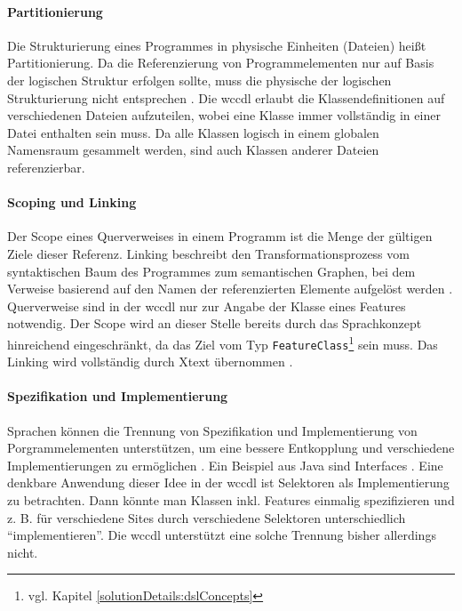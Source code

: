     \paragraph{Partitionierung}
    Die Strukturierung eines Programmes in physische Einheiten (Dateien) heißt Partitionierung.
    Da die Referenzierung von Programmelementen nur auf Basis der logischen Struktur erfolgen sollte,
    muss die physische der logischen Strukturierung nicht entsprechen
    \cite[Kapitel 5.1.2]{voelter:DslEngineering}.
    Die \gls{wccdl} erlaubt die Klassendefinitionen auf verschiedenen Dateien
    aufzuteilen, wobei eine Klasse immer vollständig in einer Datei enthalten sein muss.
    Da alle Klassen logisch in einem globalen Namensraum gesammelt werden,
    sind auch Klassen anderer Dateien referenzierbar.

    \paragraph{Scoping und Linking}
    Der Scope eines Querverweises in einem Programm ist die Menge der
    gültigen Ziele dieser Referenz.
    Linking beschreibt den Transformationsprozess vom syntaktischen Baum des Programmes
    zum semantischen Graphen, bei dem Verweise basierend auf den Namen der referenzierten
    Elemente aufgelöst werden
    \cite[Kapitel 8]{voelter:DslEngineering}.
    Querverweise sind in der \gls{wccdl} nur zur Angabe der Klasse eines Features notwendig.
    Der Scope wird an dieser Stelle bereits durch das Sprachkonzept hinreichend
    eingeschränkt, da das Ziel vom Typ
    \texttt{FeatureClass}\footnote{vgl. Kapitel \ref{solutionDetails:dslConcepts}} sein muss.
    Das Linking wird vollständig durch Xtext übernommen
    \cite[Kapitel "`Language Implementation"']{xtext:documentation}.

    \paragraph{Spezifikation und Implementierung}
    Sprachen können die Trennung von Spezifikation und Implementierung von
    Porgrammelementen unterstützen, um eine bessere Entkopplung und verschiedene
    Implementierungen zu ermöglichen \cite[Kapitel 5.1.3]{voelter:DslEngineering}.
    Ein Beispiel aus Java sind Interfaces \cite[Kapitel 9]{oracle:javaSpec}.
    Eine denkbare Anwendung dieser Idee in der \gls{wccdl} ist Selektoren als
    Implementierung zu betrachten. Dann könnte man Klassen inkl. Features einmalig spezifizieren
    und z. B. für verschiedene Sites durch verschiedene Selektoren unterschiedlich "`implementieren"'.
    Die \gls{wccdl} unterstützt eine solche Trennung bisher allerdings nicht.

